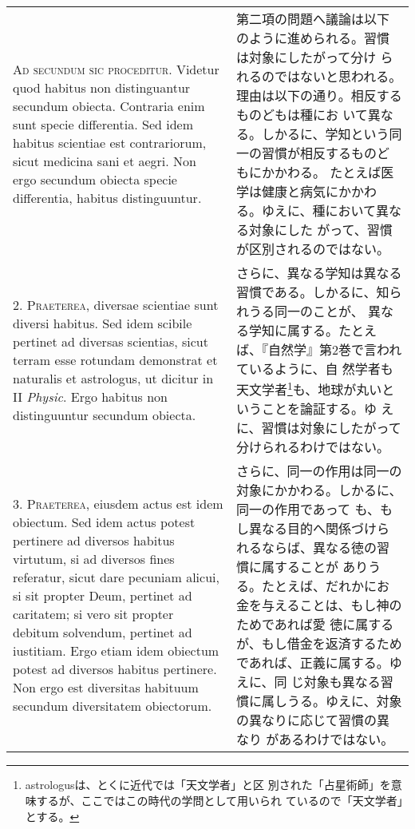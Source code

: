 \documentclass[10pt]{jsarticle} %
\begin{document}
\begin{longtable}{p{21em}p{21em}}


{\scshape Ad secundum sic proceditur}. Videtur quod habitus non
distinguantur secundum obiecta. Contraria enim sunt specie
differentia. Sed idem habitus scientiae est contrariorum, sicut
medicina sani et aegri. Non ergo secundum obiecta specie differentia,
habitus distinguuntur.

&

第二項の問題へ議論は以下のように進められる。習慣は対象にしたがって分け
られるのではないと思われる。理由は以下の通り。相反するものどもは種にお
いて異なる。しかるに、学知という同一の習慣が相反するものどもにかかわる。
たとえば医学は健康と病気にかかわる。ゆえに、種において異なる対象にした
がって、習慣が区別されるのではない。


\\



2. {\scshape Praeterea}, diversae scientiae sunt diversi habitus. Sed
idem scibile pertinet ad diversas scientias, sicut terram esse
rotundam demonstrat et naturalis et astrologus, ut dicitur in II
{\itshape Physic}. Ergo habitus non distinguuntur secundum obiecta.

&

さらに、異なる学知は異なる習慣である。しかるに、知られうる同一のことが、
異なる学知に属する。たとえば、『自然学』第2巻で言われているように、自
然学者も天文学者\footnote{astrologusは、とくに近代では「天文学者」と区
別された「占星術師」を意味するが、ここではこの時代の学問として用いられ
ているので「天文学者」とする。}も、地球が丸いということを論証する。ゆ
えに、習慣は対象にしたがって分けられるわけではない。


\\


3. {\scshape Praeterea}, eiusdem actus est idem obiectum. Sed idem
actus potest pertinere ad diversos habitus virtutum, si ad diversos
fines referatur, sicut dare pecuniam alicui, si sit propter Deum,
pertinet ad caritatem; si vero sit propter debitum solvendum, pertinet
ad iustitiam. Ergo etiam idem obiectum potest ad diversos habitus
pertinere. Non ergo est diversitas habituum secundum diversitatem
obiectorum.

&


さらに、同一の作用は同一の対象にかかわる。しかるに、同一の作用であって
も、もし異なる目的へ関係づけられるならば、異なる徳の習慣に属することが
ありうる。たとえば、だれかにお金を与えることは、もし神のためであれば愛
徳に属するが、もし借金を返済するためであれば、正義に属する。ゆえに、同
じ対象も異なる習慣に属しうる。ゆえに、対象の異なりに応じて習慣の異なり
があるわけではない。


\end{longtable}
\end{document}
